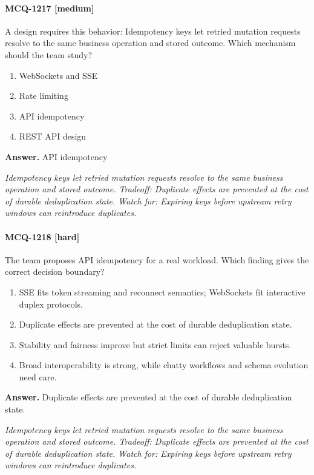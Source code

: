 \paragraph{MCQ-1217 [medium]} A design requires this behavior: Idempotency keys let retried mutation requests resolve to the same business operation and stored outcome. Which mechanism should the team study?
\begin{enumerate}[label=\Alph*.]
\item WebSockets and SSE
\item Rate limiting
\item API idempotency
\item REST API design
\end{enumerate}
\noindent\textbf{Answer.} API idempotency
\par\textit{Idempotency keys let retried mutation requests resolve to the same business operation and stored outcome. Tradeoff: Duplicate effects are prevented at the cost of durable deduplication state. Watch for: Expiring keys before upstream retry windows can reintroduce duplicates.}
\paragraph{MCQ-1218 [hard]} The team proposes API idempotency for a real workload. Which finding gives the correct decision boundary?
\begin{enumerate}[label=\Alph*.]
\item SSE fits token streaming and reconnect semantics; WebSockets fit interactive duplex protocols.
\item Duplicate effects are prevented at the cost of durable deduplication state.
\item Stability and fairness improve but strict limits can reject valuable bursts.
\item Broad interoperability is strong, while chatty workflows and schema evolution need care.
\end{enumerate}
\noindent\textbf{Answer.} Duplicate effects are prevented at the cost of durable deduplication state.
\par\textit{Idempotency keys let retried mutation requests resolve to the same business operation and stored outcome. Tradeoff: Duplicate effects are prevented at the cost of durable deduplication state. Watch for: Expiring keys before upstream retry windows can reintroduce duplicates.}
